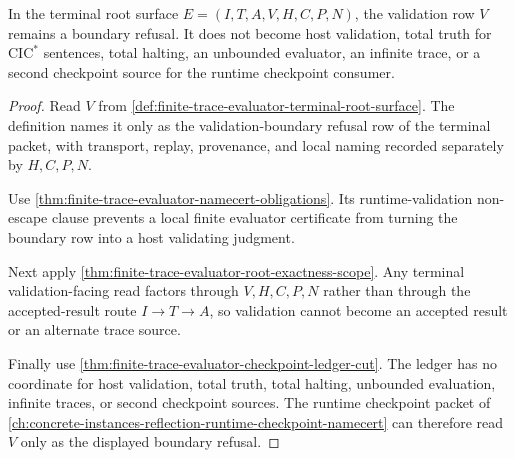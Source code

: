 \begin{theorem}
\label{thm:finite-trace-evaluator-terminal-validation-nonescape}
In the terminal root surface
$E=(I,T,A,V,H,C,P,N)$, the validation row $V$ remains a boundary refusal. It
does not become host validation, total truth for $\mathrm{CIC}^{*}$ sentences,
total halting, an unbounded evaluator, an infinite trace, or a second
checkpoint source for the runtime checkpoint consumer.
\end{theorem}
\begin{proof}
Read $V$ from \autoref{def:finite-trace-evaluator-terminal-root-surface}. The
definition names it only as the validation-boundary refusal row of the terminal
packet, with transport, replay, provenance, and local naming recorded
separately by $H,C,P,N$.

Use \autoref{thm:finite-trace-evaluator-namecert-obligations}. Its
runtime-validation non-escape clause prevents a local finite evaluator
certificate from turning the boundary row into a host validating judgment.

Next apply \autoref{thm:finite-trace-evaluator-root-exactness-scope}. Any
terminal validation-facing read factors through $V,H,C,P,N$ rather than
through the accepted-result route $I \to T \to A$, so validation cannot become
an accepted result or an alternate trace source.

Finally use \autoref{thm:finite-trace-evaluator-checkpoint-ledger-cut}. The
ledger has no coordinate for host validation, total truth, total halting,
unbounded evaluation, infinite traces, or second checkpoint sources. The
runtime checkpoint packet of
\autoref{ch:concrete-instances-reflection-runtime-checkpoint-namecert} can
therefore read $V$ only as the displayed boundary refusal.
\end{proof}
